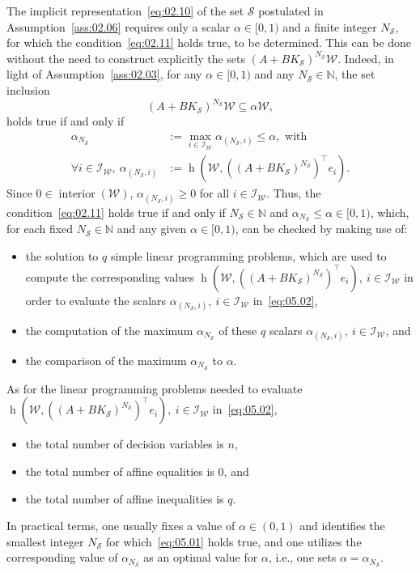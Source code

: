 \documentclass[twocolumn]{autart}
\newcommand{\mb}[1]{\mathbb{#1}}
\newcommand{\mc}[1]{\mathcal{#1}}
\newcommand{\N}{\mb{N}}
\newcommand{\support}[2]{\operatorname{h}(#1,#2)}
\numberwithin{equation}{section}
\begin{document}
The implicit representation~\eqref{eq:02.10} of  the set $\mc{S}$ postulated in Assumption~\ref{ass:02.06} requires only a scalar $\alpha\in [0,1)$ and a finite integer $N_\mc{S}$, for which the condition~\eqref{eq:02.11} holds true, to be determined. This can be done without the need to construct explicitly the sets $(A+BK_\mc{S})^{N_\mc{S}}\mc{W}$. Indeed, in light of Assumption~\ref{ass:02.03}, for any  $\alpha\in [0,1)$ and any $N_\mc{S}\in \N$, the set inclusion 
\begin{equation*}
(A+BK_\mc{S})^{N_\mc{S}}\mc{W}\subseteq \alpha \mc{W},
\end{equation*}
holds true if and only if  
\begin{align}
\label{eq:05.01}
\alpha_{N_\mc{S}}&:=\max_{i\in\mc{I}_\mc{W}} \alpha_{(N_\mc{S},i)} \le \alpha,\text{ with}\\
\label{eq:05.02}
\forall i\in\mc{I}_\mc{W},\  \alpha_{(N_\mc{S},i)}&:=\support{\mc{W}}{((A+BK_\mc{S})^{N_\mc{S}})^\top e_i}.
\end{align}
Since $0\in\operatorname{interior}(\mc{W})$, $\alpha_{(N_\mc{S},i)}\ge 0$ for all $i\in\mc{I}_\mc{W}$. Thus, the condition~\eqref{eq:02.11} holds true if and only if $N_\mc{S}\in\N$ and $\alpha_{N_\mc{S}}\le\alpha\in[0,1)$, which, for each fixed $N_\mc{S}\in\N$ and any given $\alpha \in [0,1)$,  can be checked by making use of:
\begin{itemize}
\item the solution to $q$ simple linear programming problems,  which are used to compute the corresponding values $\support{\mc{W}}{((A+BK_\mc{S})^{N_\mc{S}})^\top e_i},\ i\in\mc{I}_\mc{W}$ in order to evaluate the scalars $\alpha_{(N_\mc{S},i)},\ i\in\mc{I}_\mc{W}$ in~\eqref{eq:05.02},
\item  the computation of the maximum $\alpha_{N_\mc{S}}$ of these $q$ scalars $\alpha_{(N_\mc{S},i)},\ i\in\mc{I}_\mc{W}$, and
\item  the comparison of the maximum $\alpha_{N_\mc{S}}$ to $\alpha$.
\end{itemize}
As for the linear programming problems needed to evaluate $\support{\mc{W}}{((A+BK_\mc{S})^{N_\mc{S}})^\top e_i},\ i\in\mc{I}_\mc{W}$  in~\eqref{eq:05.02},
\begin{itemize}
\item the total number of decision variables is $n$,
\item the total number of affine equalities is $0$, and 
\item the total number of affine inequalities is $q$.
\end{itemize}
In practical terms, one usually fixes a value of $\alpha\in (0,1)$ and identifies the smallest integer $N_\mc{S}$ for which~\eqref{eq:05.01} holds true, and one utilizes the corresponding value of $\alpha_{N_\mc{S}}$ as an optimal value for $\alpha$, i.e., one sets $\alpha=\alpha_{N_\mc{S}}$.
\end{document}
